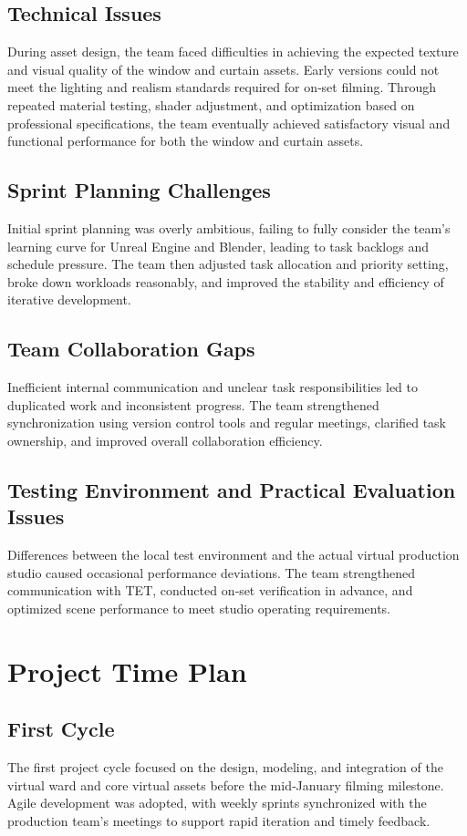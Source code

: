 \documentclass[12pt,a4paper]{report}
\begin{document}
\subsection{Technical Issues}
During asset design, the team faced difficulties in achieving the expected texture and visual quality of the window and curtain assets. Early versions could not meet the lighting and realism standards required for on‑set filming. Through repeated material testing, shader adjustment, and optimization based on professional specifications, the team eventually achieved satisfactory visual and functional performance for both the window and curtain assets.

\subsection{Sprint Planning Challenges}
Initial sprint planning was overly ambitious, failing to fully consider the team’s learning curve for Unreal Engine and Blender, leading to task backlogs and schedule pressure. The team then adjusted task allocation and priority setting, broke down workloads reasonably, and improved the stability and efficiency of iterative development.

\subsection{Team Collaboration Gaps}
Inefficient internal communication and unclear task responsibilities led to duplicated work and inconsistent progress. The team strengthened synchronization using version control tools and regular meetings, clarified task ownership, and improved overall collaboration efficiency.

\subsection{Testing Environment and Practical Evaluation Issues}
Differences between the local test environment and the actual virtual production studio caused occasional performance deviations. The team strengthened communication with TET, conducted on‑set verification in advance, and optimized scene performance to meet studio operating requirements.

\section{Project Time Plan}

\subsection{First Cycle}
The first project cycle focused on the design, modeling, and integration of the virtual ward and core virtual assets before the mid‑January filming milestone. Agile development was adopted, with weekly sprints synchronized with the production team’s meetings to support rapid iteration and timely feedback.
\end{document}
